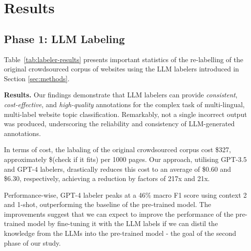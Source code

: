 \section{Results}

\subsection*{Phase 1: LLM Labeling}



Table~\ref{tab:labeler-results} presents important statistics of the re-labelling of the original crowdsourced corpus of websites using the LLM labelers introduced in Section \ref{sec:methods}.

\textbf{Results.} Our findings demonstrate that LLM labelers can provide \textit{consistent}, \textit{cost-effective}, and \textit{high-quality} annotations for the complex task of multi-lingual, multi-label website topic classification. 
Remarkably, not a single incorrect output was produced, underscoring the reliability and consistency of LLM-generated annotations.

In terms of cost, the labaling of the original crowdsourced corpus cost \$327, approximately \$(check if it fits) per 1000 pages.
Our approach, utilising GPT-3.5 and GPT-4 labelers, drastically reduces this cost to an average of
 \$0.60 and \$6.30, respectively, achieving a reduction by factors of 217x and 21x.






Performance-wise, GPT-4 labeler peaks at a 46\% macro F1 score using context 2 and 1-shot, outperforming the baseline of the pre-trained model. 
The improvements suggest that we can expect to improve the performance of the pre-trained model by fine-tuning it with the LLM labels if we can distil the knowledge from the LLMs into the pre-trained model - the goal of the second phase of our study.

